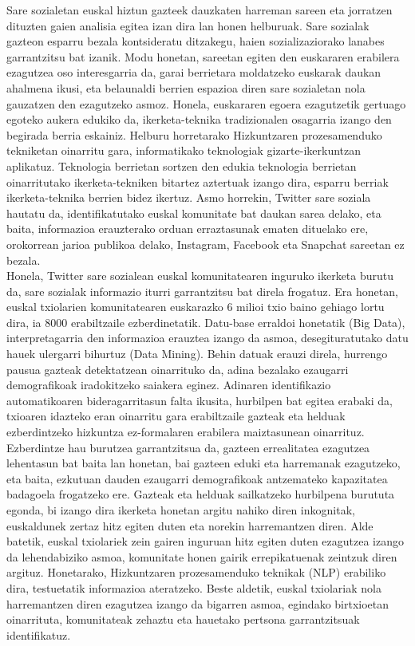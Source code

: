 \documentclass[information,article,submit,moreauthors,pdftex,10pt,a4paper]{Definitions/mdpi}
\begin{document}
\indent Sare sozialetan euskal hiztun gazteek dauzkaten harreman sareen eta jorratzen dituzten gaien analisia egitea izan dira lan honen helburuak. Sare sozialak gazteon esparru bezala kontsideratu ditzakegu, haien sozializaziorako lanabes garrantzitsu bat izanik. Modu honetan, sareetan egiten den euskararen erabilera ezagutzea oso interesgarria da, garai berrietara moldatzeko euskarak daukan ahalmena ikusi, eta belaunaldi berrien espazioa diren sare sozialetan nola gauzatzen den ezagutzeko asmoz. Honela, euskararen egoera ezagutzetik gertuago egoteko aukera edukiko da, ikerketa-teknika tradizionalen osagarria izango den begirada berria eskainiz. Helburu horretarako Hizkuntzaren prozesamenduko tekniketan oinarritu gara, informatikako teknologiak gizarte-ikerkuntzan aplikatuz. Teknologia berrietan sortzen den edukia teknologia berrietan oinarritutako ikerketa-tekniken bitartez aztertuak izango dira, esparru berriak ikerketa-teknika berrien bidez ikertuz. Asmo horrekin, Twitter sare soziala hautatu da, identifikatutako euskal komunitate bat daukan sarea delako, eta baita, informazioa erauzterako orduan erraztasunak ematen dituelako ere, orokorrean jarioa publikoa delako, Instagram, Facebook eta Snapchat sareetan ez bezala.\\
\indent Honela, Twitter sare sozialean euskal komunitatearen inguruko ikerketa burutu da, sare sozialak informazio iturri garrantzitsu bat direla frogatuz. Era honetan, euskal txiolarien komunitatearen euskarazko 6 milioi txio baino gehiago lortu dira, ia 8000 erabiltzaile ezberdinetatik. Datu-base erraldoi honetatik (Big Data), interpretagarria den informazioa erauztea izango da asmoa, desegituratutako datu hauek ulergarri bihurtuz (Data Mining). Behin datuak erauzi direla, hurrengo pausua gazteak detektatzean oinarrituko da, adina bezalako ezaugarri demografikoak iradokitzeko saiakera eginez. Adinaren identifikazio automatikoaren bideragarritasun falta ikusita, hurbilpen bat egitea erabaki da, txioaren idazteko eran oinarritu gara erabiltzaile gazteak eta helduak ezberdintzeko hizkuntza ez-formalaren erabilera maiztasunean oinarrituz. Ezberdintze hau burutzea garrantzitsua da, gazteen errealitatea ezagutzea lehentasun bat baita lan honetan, bai gazteen eduki eta harremanak ezagutzeko, eta baita, ezkutuan dauden ezaugarri demografikoak antzemateko kapazitatea badagoela frogatzeko ere. Gazteak eta helduak sailkatzeko hurbilpena burututa egonda, bi izango dira ikerketa honetan argitu nahiko diren inkognitak, euskaldunek zertaz hitz egiten duten eta norekin harremantzen diren. Alde batetik, euskal txiolariek zein gairen inguruan hitz egiten duten ezagutzea izango da lehendabiziko asmoa, komunitate honen gairik errepikatuenak zeintzuk diren argituz. Honetarako, Hizkuntzaren prozesamenduko teknikak (NLP) erabiliko dira, testuetatik informazioa ateratzeko. Beste aldetik, euskal txiolariak nola harremantzen diren ezagutzea izango da bigarren asmoa, egindako birtxioetan oinarrituta, komunitateak zehaztu eta hauetako pertsona garrantzitsuak identifikatuz.\\
\end{document}
